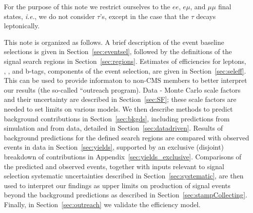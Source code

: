 
For the purpose of this note we restrict ourselves to the $ee$, $e\mu$, and $\mu\mu$ 
final states, {\em i.e.}, we do not consider $\tau$'s, except in the case that the $\tau$ decays leptonically.

This note is organized as follows.
A brief description of the event baseline selections is given in Section~\ref{sec:eventsel},
followed by the definitions of the signal search regions in Section~\ref{sec:regions}.
Estimates of efficiencies for leptons, \met, \Ht, and b-tags, components of the event selection,
are given in Section~\ref{sec:seleff}.  This can be used to provide
informaton to non-CMS members to better interpret our results (the so-called
``outreach program).
Data - Monte Carlo scale factors and their uncertainty are described
in Section~\ref{sec:SF}; these scale factors are needed to set limits
on various models.
We then describe methods to predict background contributions in Section~\ref{sec:bkgds},
including predictions from simulation and from data, detailed in Section~\ref{sec:datadriven}.
Results of background predictions for the defined search regions are compared with 
observed events in data in Section~\ref{sec:yields},
supported by an exclusive (disjoint) breakdown of contributions in Appendix~\ref{sec:yields_exclusive}.
Comparisons of the predicted and observed events, together with inputs relevant
to signal selection systematic uncertainties described in Section~\ref{sec:systematic}, are then used
to interpret our findings as upper limits on production of signal events beyond
the background predictions as described in Section~\ref{sec:stampCollecting}.
Finally, in Section~\ref{sec:outreach} we validate the efficiency model.





